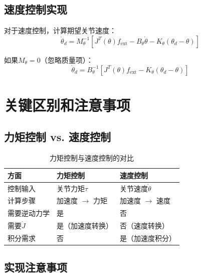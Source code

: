 \documentclass[12pt,a4paper]{article}
\begin{document}
\subsection{速度控制实现}

对于速度控制，计算期望关节速度：
\begin{equation}
\dot{\theta}_d = M_{\theta}^{-1}\left[J^T(\theta) f_{\text{ext}} - B_{\theta}\dot{\theta} - K_{\theta}(\theta_d - \theta)\right]
\end{equation}

如果$M_{\theta} = 0$（忽略质量项）：
\begin{equation}
\dot{\theta}_d = B_{\theta}^{-1}\left[J^T(\theta) f_{\text{ext}} - K_{\theta}(\theta_d - \theta)\right]
\end{equation}

\section{关键区别和注意事项}

\subsection{力矩控制 vs. 速度控制}

\begin{table}[h]
\centering
\begin{tabular}{|l|l|l|}
\hline
\textbf{方面} & \textbf{力矩控制} & \textbf{速度控制} \\
\hline
控制输入 & 关节力矩$\tau$ & 关节速度$\dot{\theta}$ \\
\hline
计算步骤 & 加速度 $\to$ 力矩 & 加速度 $\to$ 速度 \\
\hline
需要逆动力学 & 是 & 否 \\
\hline
需要$\dot{J}$ & 是（加速度转换） & 否（速度转换） \\
\hline
积分需求 & 否 & 是（加速度积分） \\
\hline
\end{tabular}
\caption{力矩控制与速度控制的对比}
\end{table}

\subsection{实现注意事项}
\end{document}
